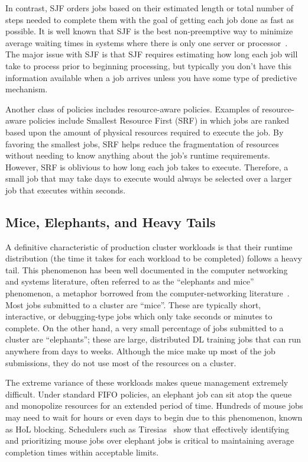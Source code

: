 In contrast, SJF orders jobs based on their estimated length or total number of steps needed to complete them with the goal of getting each job done as fast as possible. It is well known that SJF is the best non-preemptive way to minimize average waiting times in systems where there is only one server or processor~\cite{kleinrock1975queueing,harchol2013performance}. The major issue with SJF is that SJF requires estimating how long each job will take to process prior to beginning processing, but typically you don't have this information available when a job arrives unless you have some type of predictive mechanism.

Another class of policies includes resource-aware policies. Examples of resource-aware policies include Smallest Resource First (SRF) in which jobs are ranked based upon the amount of physical resources required to execute the job. By favoring the smallest jobs, SRF helps reduce the fragmentation of resources without needing to know anything about the job's runtime requirements. However, SRF is oblivious to how long each job takes to execute. Therefore, a small job that may take days to execute would always be selected over a larger job that executes within seconds.

\subsection{Mice, Elephants, and Heavy Tails}

A definitive characteristic of production cluster workloads is that their runtime distribution (the time it takes for each workload to be completed) follows a heavy tail. This phenomenon has been well documented in the computer networking and systems literature, often referred to as the ``elephants and mice'' phenomenon, a metaphor borrowed from the computer-networking literature~\cite{guo2001mice}. Most jobs submitted to a cluster are ``mice''. These are typically short, interactive, or debugging-type jobs which only take seconds or minutes to complete. On the other hand, a very small percentage of jobs submitted to a cluster are ``elephants''; these are large, distributed DL training jobs that can run anywhere from days to weeks. Although the mice make up most of the job submissions, they do not use most of the resources on a cluster.

The extreme variance of these workloads makes queue management extremely difficult. Under standard FIFO policies, an elephant job can sit atop the queue and monopolize resources for an extended period of time. Hundreds of mouse jobs may need to wait for hours or even days to begin due to this phenomenon, known as HoL blocking. Schedulers such as Tiresias~\cite{gu2019tiresias} show that effectively identifying and prioritizing mouse jobs over elephant jobs is critical to maintaining average completion times within acceptable limits.

